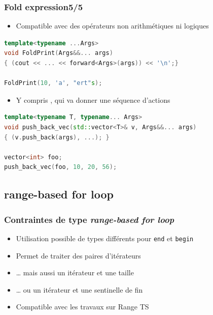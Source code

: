 \documentclass[C++.tex]{subfiles}
\begin{document}
\begin{frame}[fragile]
	\frametitle{Fold expression\titlehfill{}5/5}
	\begin{itemize}
		\item Compatible avec des opérateurs non arithmétiques ni logiques
	\end{itemize}

	\begin{lstlisting}[language=C++]
template<typename ...Args>
void FoldPrint(Args&&... args)
{ (cout << ... << forward<Args>(args)) << '\n';}

FoldPrint(10, 'a', "ert"s);\end{lstlisting}

	\begin{itemize}
		\item Y compris \og ,\fg{} qui va donner une séquence d'actions
	\end{itemize}

	\begin{lstlisting}[language=C++]
template<typename T, typename... Args>
void push_back_vec(std::vector<T>& v, Args&&... args)
{ (v.push_back(args), ...); }

vector<int> foo;
push_back_vec(foo, 10, 20, 56);\end{lstlisting}
\end{frame}

\subsection*{range-based for loop}
\begin{frame}[fragile]
	\frametitle{Contraintes de type \textit{range-based for loop}}
	\begin{itemize}
		\item Utilisation possible de types différents pour \lstinline|end| et \lstinline|begin|
		\item Permet de traiter des paires d'itérateurs
		\item \ldots{} mais aussi un itérateur et une taille
		\item \ldots{} ou un itérateur et une sentinelle de fin
		\item Compatible avec les travaux sur Range TS
		
	\end{itemize}
\end{frame}
\end{document}
